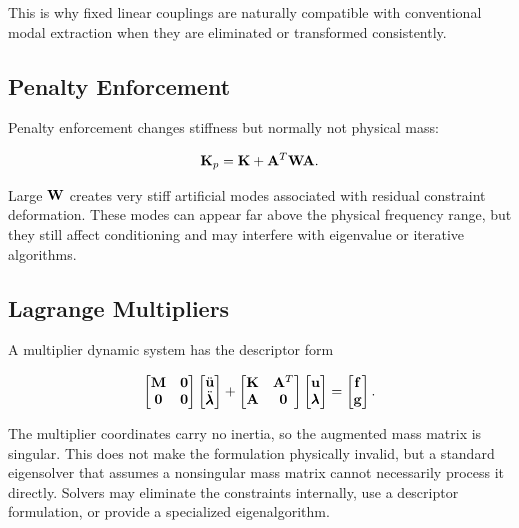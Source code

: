 This is why fixed linear couplings are naturally compatible with conventional
modal extraction when they are eliminated or transformed consistently.

\subsection{Penalty Enforcement}

Penalty enforcement changes stiffness but normally not physical mass:

\begin{equation}
    \mathbf{K}_p=\mathbf{K}+\mathbf{A}^T\mathbf{W}\mathbf{A}.
\end{equation}

Large $\mathbf{W}$ creates very stiff artificial modes associated with residual
constraint deformation. These modes can appear far above the physical frequency
range, but they still affect conditioning and may interfere with eigenvalue or
iterative algorithms.

\subsection{Lagrange Multipliers}

A multiplier dynamic system has the descriptor form

\begin{equation}
\begin{bmatrix}
\mathbf{M}&\mathbf{0}\\
\mathbf{0}&\mathbf{0}
\end{bmatrix}
\begin{bmatrix}
\ddot{\mathbf{u}}\\
\ddot{\pmb{\lambda}}
\end{bmatrix}
+
\begin{bmatrix}
\mathbf{K}&\mathbf{A}^T\\
\mathbf{A}&\mathbf{0}
\end{bmatrix}
\begin{bmatrix}
\mathbf{u}\\\pmb{\lambda}
\end{bmatrix}
=
\begin{bmatrix}
\mathbf{f}\\\mathbf{g}
\end{bmatrix}.
\end{equation}

The multiplier coordinates carry no inertia, so the augmented mass matrix is
singular. This does not make the formulation physically invalid, but a standard
eigensolver that assumes a nonsingular mass matrix cannot necessarily process it
directly. Solvers may eliminate the constraints internally, use a descriptor
formulation, or provide a specialized eigenalgorithm.

